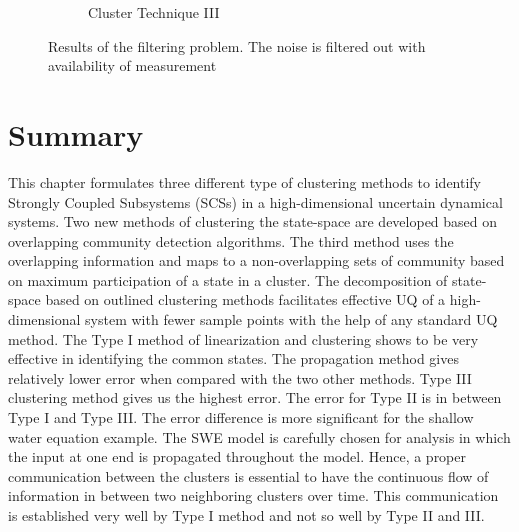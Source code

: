 \begin{figure}[H]
\begin{subfigure}[b]{0.3\textwidth}
\caption{Cluster Technique III}
\end{subfigure}
\caption{Results of the filtering problem. The noise is filtered out with availability of measurement}
\label{filterplot}
\end{figure} 

\section{Summary}

This chapter formulates three different type of clustering methods to identify Strongly Coupled Subsystems (SCSs) in a high-dimensional uncertain dynamical systems. Two new methods of clustering the state-space are developed based on overlapping community detection algorithms. The third method uses the overlapping information and maps to a non-overlapping sets of community based on maximum participation of a state in a cluster. The decomposition of state-space based on outlined clustering methods facilitates effective UQ of a high-dimensional  system with fewer sample points with the help of any standard UQ method. 
The Type I method of linearization and clustering shows to be very effective in identifying the common states. The propagation method gives relatively lower error when compared with the two other methods. Type III clustering method gives us the highest error. The error for Type II is in between Type I and Type III. The error difference is more significant for the shallow water equation example.  The SWE model is carefully chosen for analysis in which the input at one end is propagated throughout the model. Hence, a proper communication between the clusters is essential to have the continuous flow of information in between two neighboring clusters over time. This communication is established very well by Type I method and not so well by Type II and III. 



